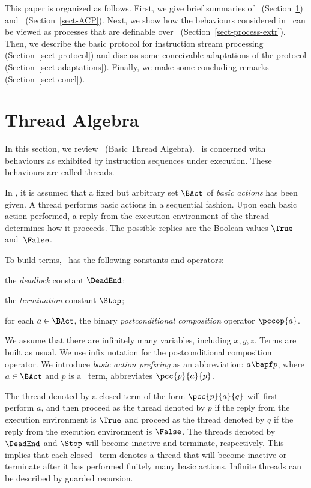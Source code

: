 \documentclass[fleqn]{llncs}
\begin{document}
This paper is organized as follows.
First, we give brief summaries of \BTA\ (Section~\ref{sect-BTA}) and
\ACPt\ (Section~\ref{sect-ACP}).
Next, we show how the behaviours considered in \BTA\ can be viewed as
processes that are definable over \ACPt\
(Section~\ref{sect-process-extr}).
Then, we describe the basic protocol for instruction stream processing
(Section~\ref{sect-protocol}) and discuss some conceivable adaptations
of the protocol (Section~\ref{sect-adaptations}).
Finally, we make some concluding remarks (Section~\ref{sect-concl}).

\section{Thread Algebra}
\label{sect-BTA}

In this section, we review \BTA\ (Basic Thread Algebra).
\BTA\ is concerned with behaviours as exhibited by instruction sequences
under execution.
These behaviours are called threads.

In \BTA, it is assumed that a fixed but arbitrary set $\BAct$ of
\emph{basic actions} has been given.
A thread performs basic actions in a sequential fashion.
Upon each basic action performed, a reply from the execution environment
of the thread determines how it proceeds.
The possible replies are the Boolean values $\True$ and~$\False$.

To build terms, \BTA\  has the following constants and operators:
\begin{iteml}
\item
the \emph{deadlock} constant $\DeadEnd$;
\item
the \emph{termination} constant $\Stop$;
\item
for each $a \in \BAct$, the binary \emph{postconditional composition}
operator $\pccop{a}$.
\end{iteml}
We assume that there are infinitely many variables, including $x,y,z$.
Terms are built as usual.
We use infix notation for the postconditional composition operator.
We introduce \emph{basic action prefixing} as an abbreviation:
$a \bapf p$, where $a \in \BAct$ and $p$ is a \BTA\ term, abbreviates
$\pcc{p}{a}{p}$.

The thread denoted by a closed term of the form $\pcc{p}{a}{q}$ will
first perform $a$, and then proceed as the thread denoted by $p$
if the reply from the execution environment is $\True$ and proceed as
the thread denoted by $q$ if the reply from the execution environment is
$\False$.
The threads denoted by $\DeadEnd$ and $\Stop$ will become inactive and
terminate, respectively.
This implies that each closed \BTA\ term denotes a thread that will
become inactive or terminate after it has performed finitely many
basic actions.
Infinite threads can be described by guarded recursion.
\end{document}
